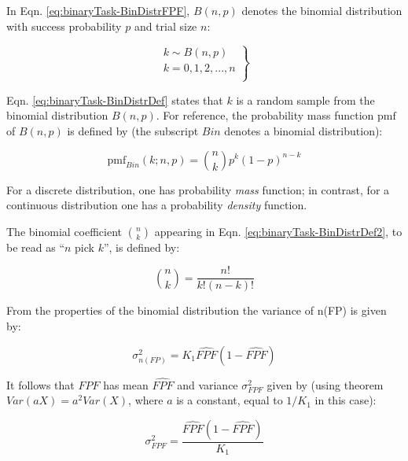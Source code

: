 \documentclass[
]{book}
\begin{document}
In Eqn. \eqref{eq:binaryTask-BinDistrFPF}, \(B(n,p)\) denotes the binomial distribution with success probability \(p\) and trial size \(n\):

\begin{equation} 
\left.\begin{matrix}
k \sim B\left ( n, p \right )\\
k=0,1,2,...,n\\
\end{matrix}\right\}
\label{eq:binaryTask-BinDistrDef}
\end{equation}

Eqn. \eqref{eq:binaryTask-BinDistrDef} states that \(k\) is a random sample from the binomial distribution \(B(n,p)\). For reference, the probability mass function \(\text{pmf}\) of \(B(n,p)\) is defined by (the subscript \(Bin\) denotes a binomial distribution):

\begin{equation} 
\text{pmf}_{Bin}\left ( k;n,p \right )=\binom{n}{k}p^k(1-p)^{n-k}
\label{eq:binaryTask-BinDistrDef2}
\end{equation}

For a discrete distribution, one has probability \emph{mass} function; in contrast, for a continuous distribution one has a probability \emph{density} function.

The binomial coefficient \(\binom{n}{k}\) appearing in Eqn. \eqref{eq:binaryTask-BinDistrDef2}, to be read as ``\(n\) pick \(k\)'', is defined by:

\begin{equation} 
\binom{n}{k}=\frac{n!}{k!(n-k)!}
\label{eq:binaryTask-BinCoeff}
\end{equation}

From the properties of the binomial distribution the variance of n(FP) is given by:

\begin{equation} 
\sigma_{n(FP)}^2=K_1\widehat{FPF}\left ( 1 - \widehat{FPF} \right )
\label{eq:binaryTask-Var-n-FP}
\end{equation}

It follows that \(FPF\) has mean \(\widehat{FPF}\) and variance \(\sigma_{FPF}^2\) given by (using theorem \(Var(aX) = a^2 Var(X)\), where \(a\) is a constant, equal to \(1/K_1\) in this case):

\begin{equation} 
\sigma_{FPF}^2 = \frac{\widehat{FPF}\left ( 1 - \widehat{FPF} \right )}{K_1}
\label{eq:binaryTask-Var-FPF}
\end{equation}
\end{document}

